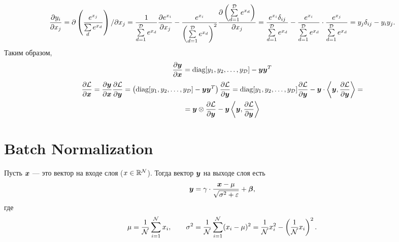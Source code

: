 \documentclass{report}
\numberwithin{theorem}{chapter}
\numberwithin{statement}{chapter}
\numberwithin{lemma}{chapter}
\theoremstyle{definition}
\numberwithin{task}{chapter}
\theoremstyle{remark}
\numberwithin{example}{chapter}
\theoremstyle{definition}
\numberwithin{definition}{chapter}
\theoremstyle{remark}
\theoremstyle{remark}
\numberwithin{lyrics}{section}
\begin{document}
\begin{gather*}
\frac{\partial y_i }{\partial x_j} = \partial \left(\frac{e^{x_j}}{\sum\limits_d e^{x_d}}\right) / \partial x_j = \frac{1}{\sum\limits_{d=1}^{\mathcal{D}} e^{x_d}} \frac{\partial e^{x_i} }{\partial x_j} - \frac{e^{x_i}}{\left(\sum\limits_{d=1}^{\mathcal{D}} e^{x_d}\right)^2} \frac{\partial \left(\sum\limits_{d=1}^{\mathcal{D}} e^{x_d}\right) }{\partial x_j} = \frac{e^{x_i}\delta_{ij}}{\sum\limits_{d=1}^{\mathcal{D}} e^{x_d}} - \frac{e^{x_i}}{\sum\limits_{d=1}^{\mathcal{D}} e^{x_d}} \cdot \frac{e^{x_j}}{\sum\limits_{d=1}^{\mathcal{D}} e^{x_d}} = y_j \delta_{ij} - y_i y_j.
\end{gather*}
Таким образом,
\begin{gather*}
\frac{\partial \boldsymbol{y} }{\partial \boldsymbol{x}} = \text{diag}[y_1, y_2, \dots, y_{\mathcal{D}}] - \boldsymbol{y} \boldsymbol{y}^T
\end{gather*}
\begin{gather*}
\frac{\partial \mathcal{L} }{\partial \boldsymbol{x}} = \frac{\partial \boldsymbol{y} }{\partial \boldsymbol{x}} \frac{\partial \mathcal{L} }{\partial \boldsymbol{y}} = \left(\text{diag}[y_1, y_2, \dots, y_{\mathcal{D}}] - \boldsymbol{y} \boldsymbol{y}^T\right) \frac{\partial \mathcal{L} }{\partial \boldsymbol{y}} = \text{diag}[y_1, y_2, \dots, y_{\mathcal{D}}] \frac{\partial \mathcal{L} }{\partial \boldsymbol{y}} - \boldsymbol{y} \cdot \left\langle \boldsymbol{y}, \frac{\partial \mathcal{L} }{\partial \boldsymbol{y}} \right\rangle = \\
= \boldsymbol{y} \otimes \frac{\partial \mathcal{L} }{\partial \boldsymbol{y}} - \boldsymbol{y} \left\langle \boldsymbol{y}, \frac{\partial \mathcal{L} }{\partial \boldsymbol{y}} \right\rangle
\end{gather*}

\section{Batch Normalization}

Пусть $\boldsymbol{x}$ --- это вектор на входе слоя ($x \in \mathbb{R}^{\mathcal{N}}$). Тогда вектор $\boldsymbol{y}$ на выходе слоя есть
$$
\boldsymbol{y} = \gamma \cdot \frac{\boldsymbol{x} - \mu}{\sqrt{\sigma^2 + \varepsilon}} + \boldsymbol{\beta},
$$
где $$\mu = \frac{1}{\mathcal{N}}\sum\limits_{i=1}^{\mathcal{N}} x_i, \qquad \sigma^2 = \frac{1}{\mathcal{N}}\sum\limits_{i = 1}^{\mathcal{N}} (x_i - \mu)^2 = \frac{1}{\mathcal{N}} x_i^2 - \left(\frac{1}{\mathcal{N}} x_i \right)^2.$$
\end{document}

